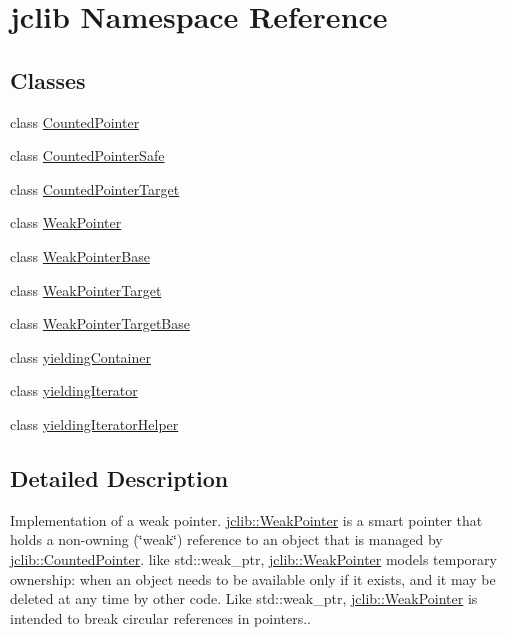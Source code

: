 \hypertarget{namespacejclib}{}\section{jclib Namespace Reference}
\label{namespacejclib}
\subsection*{Classes}
\begin{DoxyCompactItemize}
\item 
class \hyperlink{classjclib_1_1CountedPointer}{Counted\+Pointer}
\item 
class \hyperlink{classjclib_1_1CountedPointerSafe}{Counted\+Pointer\+Safe}
\item 
class \hyperlink{classjclib_1_1CountedPointerTarget}{Counted\+Pointer\+Target}
\item 
class \hyperlink{classjclib_1_1WeakPointer}{Weak\+Pointer}
\item 
class \hyperlink{classjclib_1_1WeakPointerBase}{Weak\+Pointer\+Base}
\item 
class \hyperlink{classjclib_1_1WeakPointerTarget}{Weak\+Pointer\+Target}
\item 
class \hyperlink{classjclib_1_1WeakPointerTargetBase}{Weak\+Pointer\+Target\+Base}
\item 
class \hyperlink{classjclib_1_1yieldingContainer}{yielding\+Container}
\item 
class \hyperlink{classjclib_1_1yieldingIterator}{yielding\+Iterator}
\item 
class \hyperlink{classjclib_1_1yieldingIteratorHelper}{yielding\+Iterator\+Helper}
\end{DoxyCompactItemize}


\subsection{Detailed Description}
Implementation of a weak pointer. \hyperlink{classjclib_1_1WeakPointer}{jclib\+::\+Weak\+Pointer} is a smart pointer that holds a non-\/owning (\char`\"{}weak\char`\"{}) reference to an object that is managed by \hyperlink{classjclib_1_1CountedPointer}{jclib\+::\+Counted\+Pointer}. like std\+::weak\+\_\+ptr, \hyperlink{classjclib_1_1WeakPointer}{jclib\+::\+Weak\+Pointer} models temporary ownership\+: when an object needs to be available only if it exists, and it may be deleted at any time by other code. Like std\+::weak\+\_\+ptr, \hyperlink{classjclib_1_1WeakPointer}{jclib\+::\+Weak\+Pointer} is intended to break circular references in pointers..

